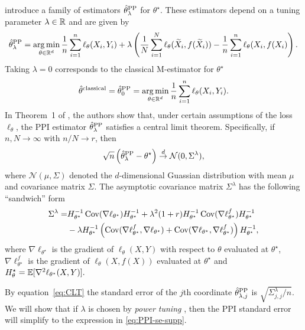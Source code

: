 \cite{angelopoulos2024ppi} introduce a family of estimators $\hat{\theta}^{\mathrm{PP}}_\lambda$ for $\theta^\star$. These estimators depend on a tuning parameter $\lambda \in \mathbb{R}$ and are given by
\[
    \hat{\theta}_{\lambda}^{\mathrm{PP}} = \operatorname*{arg\,min}_{\theta \in \mathbb{R}^d}\frac{1}{n}\sum_{i=1}^n \ell_\theta(X_i,Y_i) + \lambda\left(\frac{1}{N}\sum_{i=1}^N \ell_\theta(\widetilde{X}_i,f(\widetilde{X}_i)) - \frac{1}{n}\sum_{i=1}^n \ell_\theta(X_i, f(X_i)\right). 
\]
Taking $\lambda = 0$ corresponds to the classical M-estimator for $\theta^\star$
\[
    \hat{\theta}^{\mathrm{classical}} =\hat{\theta}^{\mathrm{PP}}_0 = \operatorname*{arg\,min}_{\theta \in \mathbb{R}^d} \frac{1}{n}\sum_{i=1}^n \ell_\theta(X_i,Y_i). 
\]
In Theorem~1 of \cite{angelopoulos2024ppi}, the authors show that, under certain assumptions of the loss $\ell_\theta$, the PPI estimator $\hat{\theta}^{\mathrm{PP}}_\lambda$ satisfies a central limit theorem. Specifically, if $n,N \to \infty$ with $n/N \to r$, then
\begin{equation}
    \label{eq:CLT}   
    \sqrt{n}\left(\hat{\theta}^{\mathrm{PP}}_\lambda - \theta^\star\right) \stackrel{d}{\to} \mathcal{N}(0,\Sigma^\lambda),
\end{equation}
where $\mathcal{N}(\mu,\Sigma)$ denoted the $d$-dimensional Guassian distribution with mean $\mu$ and covariance matrix $\Sigma$. The asymptotic covariance matrix $\Sigma^\lambda$ has the following ``sandwich'' form
\begin{align}
    \Sigma^{\lambda} =& H^{-1}_{\theta^\star}\operatorname*{Cov}(\nabla \ell_{\theta^\star})H^{-1}_{\theta^\star}+\lambda^2(1+r) H^{-1}_{\theta^\star}\operatorname*{Cov}(\nabla \ell_{\theta^\star}^f )H^{-1}_{\theta^\star}\nonumber \\
    &- \lambda H^{-1}_{\theta^\star}\left(\operatorname*{Cov}(\nabla \ell_{\theta^\star}^f,\nabla\ell_{\theta^\star})+\operatorname*{Cov}(\nabla \ell_{\theta^\star},\nabla\ell_{\theta^\star}^f)\right)H^{-1}_{\theta^\star},\label{eq:cov-matrix}
\end{align}
where $\nabla \ell_{\theta^\star}$ is the gradient of $\ell_\theta(X,Y)$ with respect to $\theta$ evaluated at $\theta^\star$, $\nabla \ell_{\theta^\star}^f$ is the gradient of $\ell_\theta(X,f(X))$ evaluated at $\theta^\star$ and $H_\theta^\star = \operatorname{\mathbb{E}}[\nabla^2 \ell_{\theta^\star}(X,Y)].$

By equation~\eqref{eq:CLT} the standard error of the $j$th coordinate $\hat{\theta}^{\mathrm{PP}}_{\lambda,j}$ is $\sqrt{\Sigma^{\lambda}_{j,j}/n}$. We will show that if $\lambda$ is chosen by \emph{power tuning} \citep[Section~6]{angelopoulos2024ppi}, then the PPI standard error will simplify to the expression in \eqref{eq:PPI-se-supp}.

